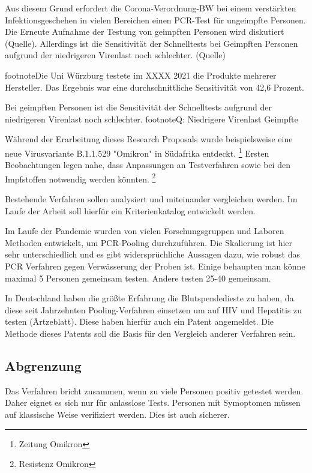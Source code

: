 Aus diesem Grund erfordert die Corona-Verordnung-BW bei einem verstärkten Infektionsgeschehen in vielen Bereichen einen PCR-Test für ungeimpfte Personen. Die Erneute Aufnahme der Testung von geimpften Personen wird diskutiert (Quelle). Allerdings ist die Sensitivität der Schnelltests bei Geimpften Personen aufgrund der niedrigeren Virenlast noch schlechter. (Quelle)

footnote{Die Uni Würzburg testete im XXXX 2021 die Produkte mehrerer Hersteller.
	Das Ergebnis war eine durchschnittliche Sensitivität von 42,6 Prozent.}

Bei geimpften Personen ist die Sensitivität der Schnelltests aufgrund der niedrigeren Virenlast noch schlechter.
footnote{Q: Niedrigere Virenlast Geimpfte}

Während der Erarbeitung dieses Research Proposals wurde beispielsweise eine neue Virusvariante B.1.1.529 "Omikron" in Südafrika entdeckt.
\footnote{Zeitung Omikron}
Ersten Beobachtungen legen nahe, dass Anpassungen an Testverfahren sowie bei den Impfstoffen notwendig werden könnten.
\footnote{Resistenz Omikron}

Bestehende Verfahren sollen analysiert und miteinander vergleichen werden.
Im Laufe der Arbeit soll hierfür ein Kriterienkatalog entwickelt werden.

Im Laufe der Pandemie wurden von vielen Forschungsgruppen und Laboren Methoden entwickelt, um PCR-Pooling durchzuführen. Die Skalierung ist hier sehr unterschiedlich und es gibt widersprüchliche Aussagen dazu, wie robust das PCR Verfahren gegen Verwässerung der Proben ist. Einige behaupten man könne maximal 5 Personen gemeinsam testen. Andere testen 25-40 gemeinsam.

In Deutschland haben die größte Erfahrung die Blutspendedieste zu haben, da diese seit Jahrzehnten Pooling-Verfahren einsetzen um auf HIV und Hepatitis zu testen (Ärtzeblatt). Diese haben hierfür auch ein Patent angemeldet. Die Methode dieses Patents soll die Basis für den Vergleich anderer Verfahren sein.

\subsection{Abgrenzung}
Das Verfahren bricht zusammen, wenn zu viele Personen positiv getestet werden.
Daher eignet es sich nur für anlasslose Tests.
Personen mit Symoptomen müssen auf klassische Weise verifiziert werden. Dies ist auch sicherer.
\fi